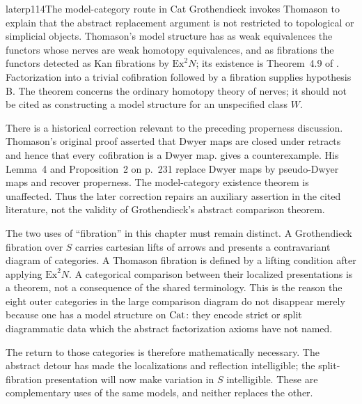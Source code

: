 \begin{dcomment}{later}{p114}{The model-category route in Cat}
Grothendieck invokes Thomason to explain that the abstract replacement argument is not restricted to topological or simplicial objects. Thomason's model structure has as weak equivalences the functors whose nerves are weak homotopy equivalences, and as fibrations the functors detected as Kan fibrations by $\mathrm{Ex}^2N$; its existence is Theorem~4.9 of \citet{Thomason1980}. Factorization into a trivial cofibration followed by a fibration supplies hypothesis B. The theorem concerns the ordinary homotopy theory of nerves; it should not be cited as constructing a model structure for an unspecified class $W$.

There is a historical correction relevant to the preceding properness discussion. Thomason's original proof asserted that Dwyer maps are closed under retracts and hence that every cofibration is a Dwyer map. \citet[pp.~228--229]{Cisinski1999Dwyer} gives a counterexample. His Lemma~4 and Proposition~2 on p.~231 replace Dwyer maps by pseudo-Dwyer maps and recover properness. The model-category existence theorem is unaffected. Thus the later correction repairs an auxiliary assertion in the cited literature, not the validity of Grothendieck's abstract comparison theorem.

The two uses of ``fibration'' in this chapter must remain distinct. A Grothendieck fibration over $S$ carries cartesian lifts of arrows and presents a contravariant diagram of categories. A Thomason fibration is defined by a lifting condition after applying $\mathrm{Ex}^2N$. A categorical comparison between their localized presentations is a theorem, not a consequence of the shared terminology. This is the reason the eight outer categories in the large comparison diagram do not disappear merely because one has a model structure on $\mathrm{Cat}$: they encode strict or split diagrammatic data which the abstract factorization axioms have not named.

The return to those categories is therefore mathematically necessary. The abstract detour has made the localizations and reflection intelligible; the split-fibration presentation will now make variation in $S$ intelligible. These are complementary uses of the same models, and neither replaces the other.
\end{dcomment}


